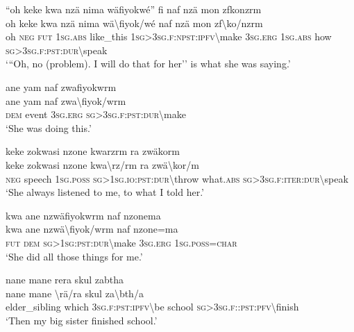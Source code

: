 \ea\label{ex:14:a3131}
``oh keke kwa nzä nima wäfiyokwé'' fi naf nzä mon zfkonzrm\\
\gll oh	keke	kwa	nzä	nima	wä{\textbackslash}fiyok/wé	naf	nzä	mon	zf{\textbackslash}ko/nzrm\\
     oh	\textsc{neg}	\textsc{fut}	1\textsc{sg}.\textsc{abs}	like\_this	1\textsc{sg}>3\textsc{sg}.\textsc{f}:\textsc{npst}:\textsc{ipfv}{\textbackslash}make	3\textsc{sg}.\textsc{erg}	1\textsc{sg}.\textsc{abs}	how	\textsc{sg}>3\textsc{sg}.\textsc{f}:\textsc{pst}:\textsc{dur}{\textbackslash}speak\\
\glt `{``}Oh, no (problem). I will do that for her'' is what she was saying.'
\z

\ea\label{ex:14:a3133}
ane yam naf zwafiyokwrm\\
\gll ane	yam	naf	zwa{\textbackslash}fiyok/wrm\\
     \textsc{dem}	event	3\textsc{sg}.\textsc{erg}	\textsc{sg}>3\textsc{sg}.\textsc{f}:\textsc{pst}:\textsc{dur}{\textbackslash}make\\
\glt `She was doing this.'
\z

\ea\label{ex:14:a3134}
keke zokwasi nzone kwarzrm ra zwäkorm\\
\gll keke	zokwasi	nzone	kwa{\textbackslash}rz/rm	ra	zwä{\textbackslash}kor/m\\
     \textsc{neg}	speech	1\textsc{sg}.\textsc{poss}	\textsc{sg}>1\textsc{sg}.\textsc{io}:\textsc{pst}:\textsc{dur}{\textbackslash}throw	what.\textsc{abs}	\textsc{sg}>3\textsc{sg}.\textsc{f}:\textsc{iter}:\textsc{dur}{\textbackslash}speak\\
\glt `She always listened to me, to what I told her.'
\z

\ea\label{ex:14:a3136}
kwa ane nzwäfiyokwrm naf nzonema\\
\gll kwa	ane	nzwä{\textbackslash}fiyok/wrm	naf	nzone=ma\\
     \textsc{fut}	\textsc{dem}	\textsc{sg}>1\textsc{sg}:\textsc{pst}:\textsc{dur}{\textbackslash}make	3\textsc{sg}.\textsc{erg}	1\textsc{sg}.\textsc{poss}=\textsc{char}\\
\glt `She did all those things for me.'
\z

\ea\label{ex:14:a3138}
nane mane rera skul zabtha\\
\gll nane	mane	{\textbackslash}rä/ra	skul	za{\textbackslash}bth/a\\
     elder\_sibling	which	3\textsc{sg}.\textsc{f}:\textsc{pst}:\textsc{ipfv}{\textbackslash}be	school	\textsc{sg}>3\textsc{sg}.\textsc{f}::\textsc{pst}:\textsc{pfv}{\textbackslash}finish\\
\glt `Then my big sister finished school.'
\z

